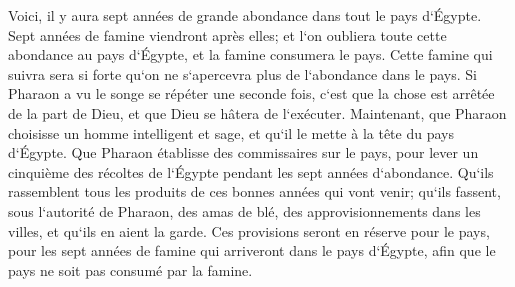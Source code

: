 \verse Voici, il y aura sept années de grande abondance dans tout le pays d`Égypte. 
\verse Sept années de famine viendront après elles; et l`on oubliera toute cette abondance au pays d`Égypte, et la famine consumera le pays. 
\verse Cette famine qui suivra sera si forte qu`on ne s`apercevra plus de l`abondance dans le pays. 
\verse Si Pharaon a vu le songe se répéter une seconde fois, c`est que la chose est arrêtée de la part de Dieu, et que Dieu se hâtera de l`exécuter. 
\verse Maintenant, que Pharaon choisisse un homme intelligent et sage, et qu`il le mette à la tête du pays d`Égypte. 
\verse Que Pharaon établisse des commissaires sur le pays, pour lever un cinquième des récoltes de l`Égypte pendant les sept années d`abondance. 
\verse Qu`ils rassemblent tous les produits de ces bonnes années qui vont venir; qu`ils fassent, sous l`autorité de Pharaon, des amas de blé, des approvisionnements dans les villes, et qu`ils en aient la garde. 
\verse Ces provisions seront en réserve pour le pays, pour les sept années de famine qui arriveront dans le pays d`Égypte, afin que le pays ne soit pas consumé par la famine. 
